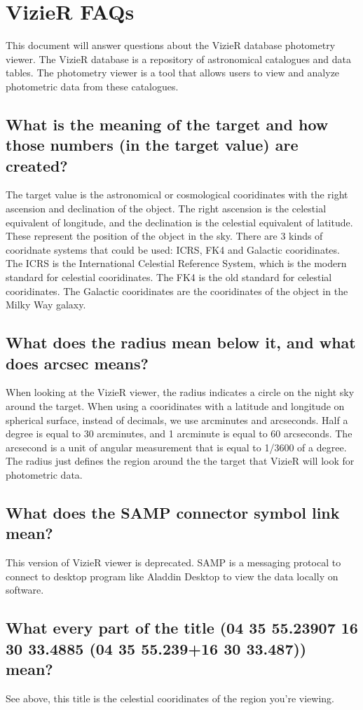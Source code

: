 \documentclass[12pt,oneside,a4paper,english]{article}
\date{\today}
\begin{document}
\section{VizieR FAQs}
This document will answer questions about the VizieR database photometry viewer. The VizieR database is a repository of astronomical catalogues and data tables. The photometry viewer is a tool that allows users to view and analyze photometric data from these catalogues.
\subsection{What is the meaning of the target and how those numbers (in the target value) are created?} 
The target value is the astronomical or cosmological cooridinates with the right ascension and declination of the object. The right ascension is the celestial equivalent of longitude, and the declination is the celestial equivalent of latitude. These represent the position of the object in the sky. There are 3 kinds of cooridnate systems that could be used: ICRS, FK4 and Galactic cooridinates. The ICRS is the International Celestial Reference System, which is the modern standard for celestial cooridinates. The FK4 is the old standard for celestial cooridinates. The Galactic cooridinates are the cooridinates of the object in the Milky Way galaxy.
\subsection{What does the radius mean below it, and what does arcsec means?}
When looking at the VizieR viewer, the radius indicates a circle on the night sky around the target. When using a cooridinates with a latitude and longitude on spherical surface, instead of decimals, we use arcminutes and arcseconds. Half a degree is equal to 30 arcminutes, and 1 arcminute is equal to 60 arcseconds. The arcsecond is a unit of angular measurement that is equal to 1/3600 of a degree. The radius just defines the region around the the target that VizieR will look for photometric data.
\subsection{What does the SAMP connector symbol link mean?}
This version of VizieR viewer is deprecated. SAMP is a messaging protocal to connect to desktop program like Aladdin Desktop to view the data locally on software.
\subsection{What every part of the title (04 35 55.23907 16 30 33.4885 (04 35 55.239+16 30 33.487)) mean?}
See above, this title is the celestial cooridinates of the region you're viewing.
\end{document}
